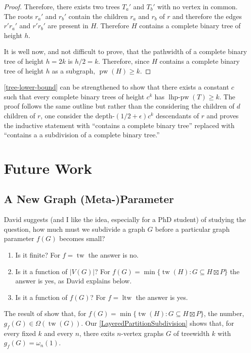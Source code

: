 \documentclass[kpfonts]{patmorin}
\DeclareMathOperator{\tw}{tw}
\DeclareMathOperator{\ltw}{ltw}
\DeclareMathOperator{\pw}{pw}
\DeclareMathOperator{\lhppw}{lhp-pw}
\begin{document}
\begin{proof}
  Therefore, there exists two trees $T_a'$ and $T_b'$ with no vertex in common.  The roots $r_a'$ and $r_b'$ contain the children $r_a$ and $r_b$ of $r$ and therefore the edges $r'r_a'$ and $r'r_b'$ are present in $H$. Therefore $H$ contains a complete binary tree of height $h$.

  It is well now, and not difficult to prove, that the pathwidth of a complete binary tree of height $h=2k$ is $h/2=k$.  Therefore, since $H$ contains a complete binary tree of height $h$ as a subgraph, $\pw(H)\ge k$.
\end{proof}

\begin{rem}
  \cref{tree-lower-bound} can be strengthened to show that there exists a constant $c$ such that every complete binary trees of height $c^k$ has $\lhppw(T)\ge k$.  The proof follows the same outline but rather than the considering the children of $d$ children of $r$, one consider the depth-$(1/2+\epsilon)c^{k}$ descendants of $r$ and proves the inductive statement with ``contains a complete binary tree'' replaced with ``contains a a subdivision of a complete binary tree.''
\end{rem}


\section{Future Work}

\subsection{A New Graph (Meta-)Parameter}

David suggests (and I like the idea, especially for a PhD student) of studying the question, how much must we subdivide a graph $G$ before a particular graph parameter $f(G)$ becomes small?

\begin{enumerate}
    \item Is it finite? For $f=\tw$ the answer is no.
    \item Is it a function of $|V(G)|$? For $f(G)=\min\{\tw(H): G\subseteq H\boxtimes P\}$ the answer is yes, as David explains below.
    \item Is it a function of $f(G)$?  For $f=\ltw$ the answer is yes.
\end{enumerate}

The result of \citet{joret.pilipczuk.ea:two} show that, for $f(G)=\min\{\tw(H): G\subseteq H\boxtimes P\}$, the number, $g_f(G)\in \Omega(\tw(G))$.  Our \cref{LayeredPartitionSubdivision} shows that, for every fixed $k$ and every $n$, there exits $n$-vertex graphs $G$ of treewidth $k$ with $g_f(G)=\omega_n(1)$.
\end{document}
